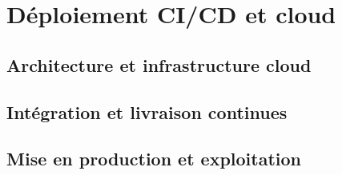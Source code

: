 \chapter{Déploiement CI/CD et cloud}

\section{Architecture et infrastructure cloud}

\section{Intégration et livraison continues}

\section{Mise en production et exploitation}

